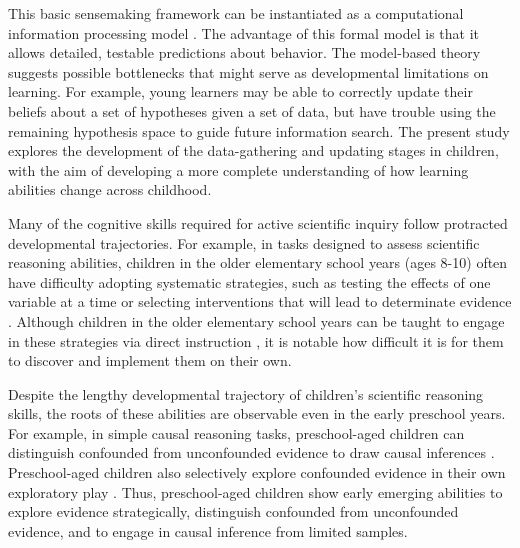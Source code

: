 \documentclass[man,floatsintext]{apa6}
\begin{document}
This basic sensemaking framework can be instantiated as a computational 
information processing model \cite{Gureckis:2012,Gureckis:2009,Markant:2012}. 
The advantage of this formal model is that it allows detailed, testable predictions 
about behavior. The model-based theory suggests possible bottlenecks that might 
serve as developmental limitations on learning. For example, young learners may be 
able to correctly update their beliefs about a set of hypotheses given a set of data, 
but have trouble using the remaining hypothesis space to guide future information 
search. The present study explores the development of the data-gathering and updating 
stages in children, with the aim of developing a more complete understanding of how 
learning abilities change across childhood.

Many of the cognitive skills required for active scientific inquiry follow protracted 
developmental trajectories. For example, in tasks designed to assess scientific 
reasoning abilities, children in the older elementary school years (ages 8-10) often 
have difficulty adopting systematic strategies, such as testing the effects of one 
variable at a time or selecting interventions that will lead to determinate evidence 
\cite{Chen:1999}. Although children in the older elementary school years can be 
taught to engage in these strategies via direct instruction \cite{Klahr:2004,Kuhn:2005}, 
it is notable how difficult it is for them to discover and implement them on their own. 

Despite the lengthy developmental trajectory of children's scientific reasoning 
skills, the roots of these abilities are observable even in the early preschool years. 
For example, in simple causal reasoning tasks, preschool-aged children can 
distinguish confounded from unconfounded evidence to draw causal inferences 
\cite{Gopnik:2001,Kushnir:2005,Kushnir:2007,Schulz:2004}. Preschool-aged 
children also selectively explore confounded evidence in their own exploratory play 
\cite{Cook:2011,Gweon:2008,Schulz:2007}. Thus, preschool-aged children show 
early emerging abilities to explore evidence strategically, distinguish confounded 
from unconfounded evidence, and to engage in causal inference from limited samples.
\end{document}
